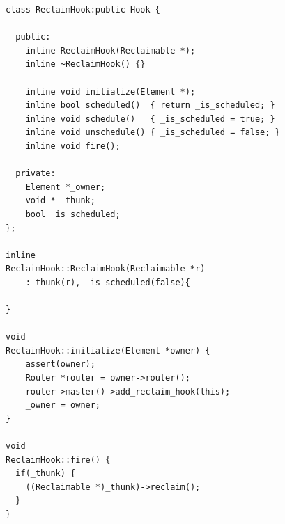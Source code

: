 \documentclass[a4paper]{article}
\begin{document}
\begin{lstlisting}[float=tph, caption=The ReclaimHook class which allows elements to schedule reclamations., label=lst:reclaimhook]
class ReclaimHook:public Hook {

  public:
    inline ReclaimHook(Reclaimable *);
    inline ~ReclaimHook() {}

    inline void initialize(Element *);
    inline bool scheduled()  { return _is_scheduled; }
    inline void schedule()   { _is_scheduled = true; } 
    inline void unschedule() { _is_scheduled = false; }
    inline void fire();

  private:
    Element *_owner;
    void * _thunk;
    bool _is_scheduled;    
};

inline
ReclaimHook::ReclaimHook(Reclaimable *r)
    :_thunk(r), _is_scheduled(false){

}

void
ReclaimHook::initialize(Element *owner) {
    assert(owner);
    Router *router = owner->router();    
    router->master()->add_reclaim_hook(this);
    _owner = owner;
}

void
ReclaimHook::fire() {
  if(_thunk) {
    ((Reclaimable *)_thunk)->reclaim();
  }
}
\end{lstlisting}
\end{document}
